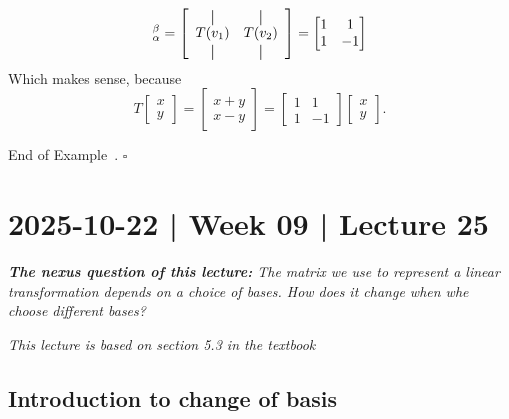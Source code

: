 \documentclass[10pt]{article}
\theoremstyle{definition}
\newtheorem{example}[theorem]{Example}
\renewenvironment{example}
{\begin{oldexample}}
  {\par\smallskip\hfill   End of Example~\theexample. $\square$    \par\end{oldexample}}
\begin{document}
\begin{example}
  \begin{equation*}
    [T]_{\alpha}^{\beta} =
    \begin{bmatrix}
      \begin{array}{cc}
        \vertbar & \vertbar\\
        T(v_{1})    & T(v_{2})\\
        \vertbar & \vertbar \\
      \end{array}
    \end{bmatrix}
    =
    \begin{bmatrix}
      1&1\\
      1&-1
    \end{bmatrix}
  \end{equation*}
  Which makes sense, because
  \begin{equation*}
    T
    \begin{bmatrix}
      x\\y
    \end{bmatrix}
    =
    \begin{bmatrix}
      x+y\\x-y
    \end{bmatrix}
    =
    \begin{bmatrix}
      1&1\\1&-1
    \end{bmatrix}
    \begin{bmatrix}
      x\\y
    \end{bmatrix}.
  \end{equation*}
\end{example}

\newpage


\newpage
\section{2025-10-22 | Week 09 | Lecture 25}
\begin{center}
  \begin{tcolorbox}[width=0.9\textwidth, colback=white, colframe=black]
    \textit{\textbf{The nexus question of this lecture:} The matrix we use to
      represent a linear transformation depends on a choice of bases. How does
      it change when whe choose different bases?}
  \end{tcolorbox}
\end{center}
\textit{This lecture is based on section 5.3 in the textbook}

\subsection{Introduction to change of basis}
\end{document}
